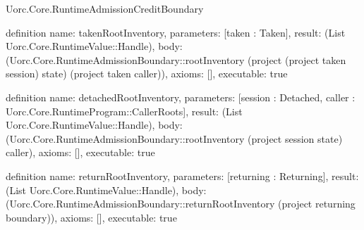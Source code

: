 \begin{lexlean}{Uorc.Core.RuntimeAdmissionCreditBoundary}
\begin{semanticmodule}
definition{
  name: takenRootInventory,
  parameters: [taken : Taken],
  result: (List Uorc.Core.RuntimeValue::Handle),
  body: (Uorc.Core.RuntimeAdmissionBoundary::rootInventory (project (project taken session) state) (project taken caller)),
  axioms: [],
  executable: true
}

definition{
  name: detachedRootInventory,
  parameters: [session : Detached, caller : Uorc.Core.RuntimeProgram::CallerRoots],
  result: (List Uorc.Core.RuntimeValue::Handle),
  body: (Uorc.Core.RuntimeAdmissionBoundary::rootInventory (project session state) caller),
  axioms: [],
  executable: true
}

definition{
  name: returnRootInventory,
  parameters: [returning : Returning],
  result: (List Uorc.Core.RuntimeValue::Handle),
  body: (Uorc.Core.RuntimeAdmissionBoundary::returnRootInventory (project returning boundary)),
  axioms: [],
  executable: true
}
\end{semanticmodule}
\end{lexlean}
